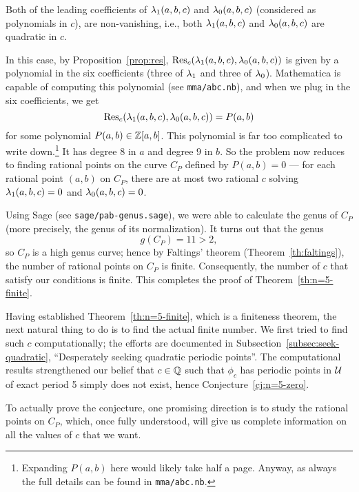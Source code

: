 \begin{case}
  Both of the leading coefficients of $\lambda_1(a, b, c)$ and $\lambda_0(a, b,
  c)$ (considered as polynomials in $c$), are non-vanishing, i.e.,
  both $\lambda_1(a, b, c)$ and $\lambda_0(a, b, c)$ are quadratic in $c$.

  In this case, by Proposition~\ref{prop:res}, $\mathrm{Res}_c(\lambda_1(a, b, c),
  \lambda_0(a, b, c))$ is given by a polynomial in the six coefficients
  (three of $\lambda_1$ and three of $\lambda_0$). Mathematica is capable of
  computing this polynomial (see \texttt{mma/abc.nb}), and when we
  plug in the six coefficients, we get
  \[
  \label{eq:pab}
  \mathrm{Res}_c(\lambda_1(a, b, c), \lambda_0(a, b, c)) = P(a, b)
  \]
  for some polynomial $P(a, b) \in \mathbb{Z}[a, b]$. This polynomial is far
  too complicated to write down.\footnote{%
    Expanding $P(a, b)$ here would likely take half a page. Anyway,
    as always the full details can be found in \texttt{mma/abc.nb}.}
  It has degree $8$ in $a$ and degree $9$ in $b$. So the problem now
  reduces to finding rational points on the curve $C_P$ defined by
  $P(a, b) = 0$ --- for each rational point $(a, b)$ on $C_P$, there
  are at most two rational $c$ solving $\lambda_1(a, b, c) = 0$ and
  $\lambda_0(a, b, c) = 0$.

  Using Sage (see \texttt{sage/pab-genus.sage}), we were able to
  calculate the genus of $C_P$ (more precisely, the genus of its
  normalization). It turns out that the genus
  \[
  g(C_P) = 11 > 2,
  \]
  so $C_P$ is a high genus curve; hence by Faltings' theorem
  (Theorem~\ref{th:faltings}), the number of rational points on $C_P$
  is finite. Consequently, the number of $c$ that satisfy our
  conditions is finite. This completes the proof of
  Theorem~\ref{th:n=5-finite}.
\end{case}

Having established Theorem~\ref{th:n=5-finite}, which is a finiteness
theorem, the next natural thing to do is to find the actual finite
number. We first tried to find such $c$ computationally; the efforts
are documented in Subsection~\ref{subsec:seek-quadratic},
``Desperately seeking quadratic periodic points''. The computational
results strengthened our belief that $c \in \mathbb{Q}$ such that $\phi_c$ has
periodic points in $\mathcal{U}$ of exact period 5 simply does not exist, hence
Conjecture~\ref{cj:n=5-zero}.

To actually prove the conjecture, one promising direction is to study
the rational points on $C_P$, which, once fully understood, will give
us complete information on all the values of $c$ that we want.


